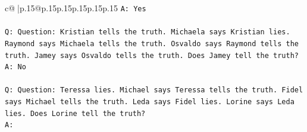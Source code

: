 \documentclass{article}
\begin{document}
{\begin{supertabular}{c@{$\;$}|p{.15\linewidth}@{}p{.15\linewidth}p{.15\linewidth}p{.15\linewidth}p{.15\linewidth}p{.15\linewidth}}
{{{\texttt{A: Yes} \\
\\ 
\texttt{Q: Question: Kristian tells the truth. Michaela says Kristian lies. Raymond says Michaela tells the truth. Osvaldo says Raymond tells the truth. Jamey says Osvaldo tells the truth. Does Jamey tell the truth?} \\
\texttt{A: No} \\
\\ 
\texttt{Q: Question: Teressa lies. Michael says Teressa tells the truth. Fidel says Michael tells the truth. Leda says Fidel lies. Lorine says Leda lies. Does Lorine tell the truth?} \\
\texttt{A:} \\
            }
        }
    }
     \\ \\


\end{supertabular}}
\end{document}

